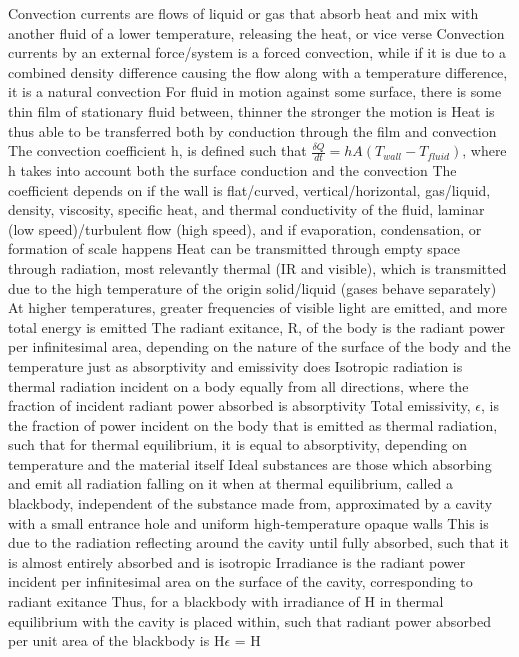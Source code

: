 \documentclass[11 pt, twoside]{article}
\newenvironment{outline*}
{
	\begin{outline}[enumerate]
	}
	{\end{outline}
}
\begin{document}
\begin{outline*}
\1 Convection currents are flows of liquid or gas that absorb heat and mix with another fluid of a lower temperature, releasing the heat, or vice verse
\2 Convection currents by an external force/system is a forced convection, while if it is due to a combined density difference causing the flow along with a temperature difference, it is a natural convection
\2 For fluid in motion against some surface, there is some thin film of stationary fluid between, thinner the stronger the motion is
\3 Heat is thus able to be transferred both by conduction through the film and convection
\2 The convection coefficient h, is defined such that $\frac{\delta Q}{dt} = hA(T_{wall} - T_{fluid})$, where h takes into account both the surface conduction and the convection
\3 The coefficient depends on if the wall is flat/curved, vertical/horizontal, gas/liquid, density, viscosity, specific heat, and thermal conductivity of the fluid, laminar (low speed)/turbulent flow (high speed), and if evaporation, condensation, or formation of scale happens
\1 Heat can be transmitted through empty space through radiation, most relevantly thermal (IR and visible), which is transmitted due to the high temperature of the origin solid/liquid (gases behave separately)
\2 At higher temperatures, greater frequencies of visible light are emitted, and more total energy is emitted
\2 The radiant exitance, R, of the body is the radiant power per infinitesimal area, depending on the nature of the surface of the body and the temperature just as absorptivity and emissivity does
\2 Isotropic radiation is thermal radiation incident on a body equally from all directions, where the fraction of incident radiant power absorbed is absorptivity
\3 Total emissivity, $\epsilon$, is the fraction of power incident on the body that is emitted as thermal radiation, such that for thermal equilibrium, it is equal to absorptivity, depending on temperature and the material itself
\3 Ideal substances are those which absorbing and emit all radiation falling on it when at thermal equilibrium, called a blackbody, independent of the substance made from, approximated by a cavity with a small entrance hole and uniform high-temperature opaque walls
\4 This is due to the radiation reflecting around the cavity until fully absorbed, such that it is almost entirely absorbed and is isotropic
\2 Irradiance is the radiant power incident per infinitesimal area on the surface of the cavity, corresponding to radiant exitance
\3 Thus, for a blackbody with irradiance of H in thermal equilibrium with the cavity is placed within, such that radiant power absorbed per unit area of the blackbody is H$\epsilon$ = H

\end{outline*}
\end{document}
